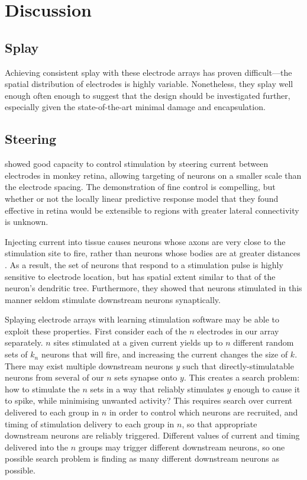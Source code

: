 \documentclass[10pt,letterpaper]{article}
\begin{document}
\section{Discussion}

\subsection{Splay}

Achieving consistent splay with these electrode arrays has proven difficult---the spatial distribution of electrodes is highly variable. Nonetheless, they splay well enough often enough to suggest that the design should be investigated further, especially given the state-of-the-art minimal damage and encapsulation.

\subsection{Steering}

\cite{Jepson2014steering_in_retina} showed good capacity to control
stimulation by steering current between electrodes in monkey retina,
allowing targeting of neurons on a smaller scale than the electrode
spacing.  The demonstration of fine control is compelling, but whether
or not the locally linear predictive response model that they found
effective in retina would be extensible to regions with greater
lateral connectivity is unknown.

Injecting current into tissue causes neurons whose axons are very
close to the stimulation site to fire, rather than neurons whose
bodies are at greater distances \cite{Histed2009stimulation}.  As a
result, the set of neurons that respond to a stimulation pulse is
highly sensitive to electrode location, but has spatial extent similar
to that of the neuron's dendritic tree.  Furthermore, they showed that
neurons stimulated in this manner seldom stimulate downstream neurons
synaptically.

Splaying electrode arrays with learning stimulation software may be
able to exploit these properties.  First consider each of the $n$
electrodes in our array separately.  $n$ sites stimulated at a given
current yields up to $n$ different random sets of $k_n$ neurons that
will fire, and increasing the current changes the size of $k$.  There
may exist multiple downstream neurons $y$ such that
directly-stimulatable neurons from several of our $n$ sets synapse
onto $y$.  This creates a search problem: how to stimulate the $n$
sets in a way that reliably stimulates $y$ enough to cause it to
spike, while minimising unwanted activity? This requires search over
current delivered to each group in $n$ in order to control which
neurons are recruited, and timing of stimulation delivery to each
group in $n$, so that appropriate downstream neurons are reliably
triggered.  Different values of current and timing delivered into the
$n$ groups may trigger different downstream neurons, so one possible
search problem is finding as many different downstream neurons as
possible.
\end{document}
